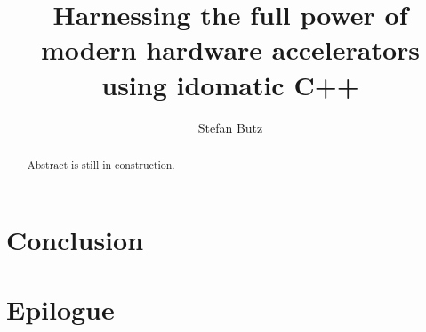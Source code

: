 \documentclass[manuscript,nonacm]{acmart}
\title{Harnessing the full power of modern hardware accelerators using idomatic C++}
\author{Stefan Butz}
\affiliation{%
    \institution{University of Hagen}
    \city{Hagen}
    \country{Germany}
}
\begin{document}
\begin{abstract}
Abstract is still in construction.
\end{abstract}


\maketitle











\section{Conclusion}


\section{Epilogue}



 
\end{document}
